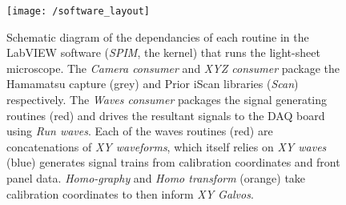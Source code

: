 %
%
%



\begin{figure}
    \centering
    \texttt{[image: /software\_layout]}
    \caption{Schematic diagram of the dependancies of each routine in the LabVIEW software (\emph{SPIM}, the kernel) that runs the light-sheet microscope.
    The \emph{Camera consumer} and \emph{XYZ consumer} package the Hamamatsu capture (grey) and Prior iScan libraries (\emph{Scan}) respectively.
    The \emph{Waves consumer} packages the signal generating routines (red) and drives the resultant signals to the DAQ board using \emph{Run waves}.
    Each of the waves routines (red) are concatenations of \emph{XY waveforms}, which itself relies on \emph{XY waves} (blue) generates signal trains from calibration coordinates and front panel data.
    \emph{Homo-graphy} and \emph{Homo transform} (orange) take calibration coordinates to then inform \emph{XY Galvos}.
    }
    \label{fig:software_layout}
\end{figure}

